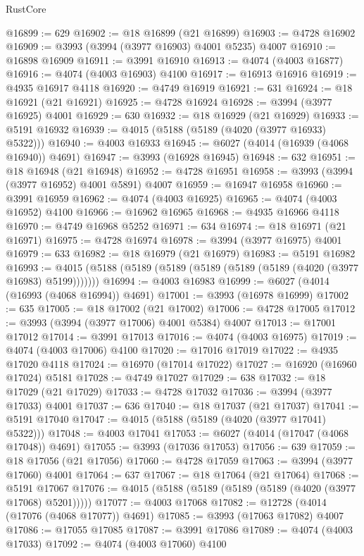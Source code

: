 \begin{lexlean}{RustCore}
\begin{coremodule}
@16899 := 629
@16902 := @18 @16899 (@21 @16899)
@16903 := @4728 @16902
@16909 := @3993 (@3994 (@3977 @16903) @4001 @5235) @4007
@16910 := @16898 @16909
@16911 := @3991 @16910
@16913 := @4074 (@4003 @16877)
@16916 := @4074 (@4003 @16903) @4100
@16917 := @16913 @16916
@16919 := @4935 @16917 @4118
@16920 := @4749 @16919
@16921 := 631
@16924 := @18 @16921 (@21 @16921)
@16925 := @4728 @16924
@16928 := @3994 (@3977 @16925) @4001
@16929 := 630
@16932 := @18 @16929 (@21 @16929)
@16933 := @5191 @16932
@16939 := @4015 (@5188 (@5189 (@4020 (@3977 @16933) @5322)))
@16940 := @4003 @16933
@16945 := @6027 (@4014 (@16939 (@4068 @16940)) @4691)
@16947 := @3993 (@16928 @16945)
@16948 := 632
@16951 := @18 @16948 (@21 @16948)
@16952 := @4728 @16951
@16958 := @3993 (@3994 (@3977 @16952) @4001 @5891) @4007
@16959 := @16947 @16958
@16960 := @3991 @16959
@16962 := @4074 (@4003 @16925)
@16965 := @4074 (@4003 @16952) @4100
@16966 := @16962 @16965
@16968 := @4935 @16966 @4118
@16970 := @4749 @16968 @5252
@16971 := 634
@16974 := @18 @16971 (@21 @16971)
@16975 := @4728 @16974
@16978 := @3994 (@3977 @16975) @4001
@16979 := 633
@16982 := @18 @16979 (@21 @16979)
@16983 := @5191 @16982
@16993 := @4015 (@5188 (@5189 (@5189 (@5189 (@5189 (@5189 (@4020 (@3977 @16983) @5199)))))))
@16994 := @4003 @16983
@16999 := @6027 (@4014 (@16993 (@4068 @16994)) @4691)
@17001 := @3993 (@16978 @16999)
@17002 := 635
@17005 := @18 @17002 (@21 @17002)
@17006 := @4728 @17005
@17012 := @3993 (@3994 (@3977 @17006) @4001 @5384) @4007
@17013 := @17001 @17012
@17014 := @3991 @17013
@17016 := @4074 (@4003 @16975)
@17019 := @4074 (@4003 @17006) @4100
@17020 := @17016 @17019
@17022 := @4935 @17020 @4118
@17024 := @16970 (@17014 @17022)
@17027 := @16920 (@16960 @17024) @5181
@17028 := @4749 @17027
@17029 := 638
@17032 := @18 @17029 (@21 @17029)
@17033 := @4728 @17032
@17036 := @3994 (@3977 @17033) @4001
@17037 := 636
@17040 := @18 @17037 (@21 @17037)
@17041 := @5191 @17040
@17047 := @4015 (@5188 (@5189 (@4020 (@3977 @17041) @5322)))
@17048 := @4003 @17041
@17053 := @6027 (@4014 (@17047 (@4068 @17048)) @4691)
@17055 := @3993 (@17036 @17053)
@17056 := 639
@17059 := @18 @17056 (@21 @17056)
@17060 := @4728 @17059
@17063 := @3994 (@3977 @17060) @4001
@17064 := 637
@17067 := @18 @17064 (@21 @17064)
@17068 := @5191 @17067
@17076 := @4015 (@5188 (@5189 (@5189 (@5189 (@4020 (@3977 @17068) @5201)))))
@17077 := @4003 @17068
@17082 := @12728 (@4014 (@17076 (@4068 @17077)) @4691)
@17085 := @3993 (@17063 @17082) @4007
@17086 := @17055 @17085
@17087 := @3991 @17086
@17089 := @4074 (@4003 @17033)
@17092 := @4074 (@4003 @17060) @4100

\end{coremodule}
\end{lexlean}
